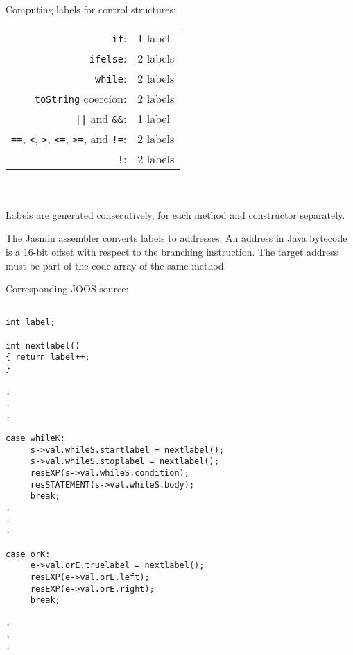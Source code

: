 \begin{slide*}
Computing labels for control structures:\\

\begin{tabular}{rl}
{\tt if}: & 1 label\\
{\tt ifelse}: & 2 labels\\
{\tt while}: & 2 labels\\
{\tt toString} coercion: & 2 labels\\
\verb"||" and \verb"&&": & 1 label\\
\verb"==", \verb"<", \verb">", \verb"<=", \verb">=", and \verb"!=": & 2 labels\\
\verb"!": & 2 labels
\end{tabular}
~\\
~\\

Labels are generated consecutively, for each method and constructor separately.

The Jasmin assembler converts labels to addresses. An address in Java bytecode
is a 16-bit offset with respect to the branching instruction. The target
address must be part of the code array of the same method. 
\vfil
\end{slide*}
 
\begin{slide*}
Corresponding JOOS source:

\begin{scriptsize}
\begin{verbatim}

int label;
 
int nextlabel()
{ return label++;
}

.
.
.

case whileK:
     s->val.whileS.startlabel = nextlabel();
     s->val.whileS.stoplabel = nextlabel();
     resEXP(s->val.whileS.condition);
     resSTATEMENT(s->val.whileS.body);
     break;
.
.
.

case orK:
     e->val.orE.truelabel = nextlabel();
     resEXP(e->val.orE.left);
     resEXP(e->val.orE.right);
     break;

.
.
.
\end{verbatim}
\end{scriptsize}

\vfil
\end{slide*}
 
